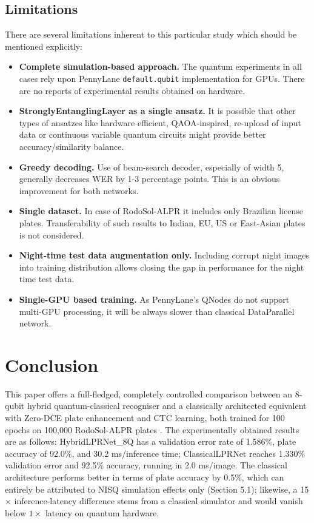 \documentclass[preprint,12pt]{elsarticle}
\begin{document}
\subsection{Limitations}
There are several limitations inherent to this particular study which should be mentioned explicitly:
\begin{itemize}
\item \textbf{Complete simulation-based approach.} The quantum experiments in all cases rely upon PennyLane \texttt{default.qubit} implementation for GPUs. There are no reports of experimental results obtained on hardware.
\item \textbf{StronglyEntanglingLayer as a single ansatz.} It is possible that other types of ansatzes like hardware efficient, QAOA-inspired, re-upload of input data \cite{b40} or continuous variable quantum circuits \cite{b39} might provide better accuracy/similarity balance.
\item \textbf{Greedy decoding.} Use of beam-search decoder, especially of width 5, generally decreases WER by 1-3 percentage points. This is an obvious improvement for both networks.
\item \textbf{Single dataset.} In case of RodoSol-ALPR it includes only Brazilian license plates. Transferability of such results to Indian, EU, US or East-Asian plates is not considered.
\item \textbf{Night-time test data augmentation only.} Including corrupt night images into training distribution allows closing the gap in performance for the night time test data.
\item \textbf{Single-GPU based training.} As PennyLane's QNodes do not support multi-GPU processing, it will be always slower than classical DataParallel network.
\end{itemize}

\section{Conclusion}
This paper offers a full-fledged, completely controlled comparison between an 8-qubit hybrid quantum-classical recogniser and a classically architected equivalent with Zero-DCE \cite{b2} plate enhancement and CTC \cite{b3} learning, both trained for 100 epochs on 100,000 RodoSol-ALPR plates \cite{b6}. The experimentally obtained results are as follows: HybridLPRNet\_8Q has a validation error rate of 1.586\%, plate accuracy of 92.0\%, and 30.2 ms/inference time; ClassicalLPRNet reaches 1.330\% validation error and 92.5\% accuracy, running in 2.0 ms/image. The classical architecture performs better in terms of plate accuracy by 0.5\%, which can entirely be attributed to NISQ simulation effects only (Section 5.1); likewise, a 15$\times$ inference-latency difference stems from a classical simulator and would vanish below $1\times$ latency on quantum hardware.
\end{document}
